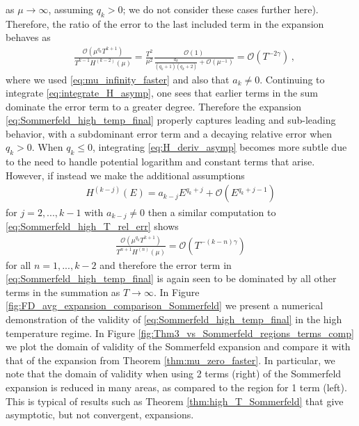 \documentclass[sn-mathphys,Numbered]{sn-jnl}
\begin{document}
as $\mu\to\infty$, assuming $q_k>0$; we do not consider these cases further here). Therefore, the ratio of the error to the last included term in the expansion behaves as
\begin{align}\label{eq:Sommerfeld_high_T_rel_err}
&\frac{\mathcal{O}(\mu^{q_k}T^{k+1})}{ T^{k-1} H^{(k-2)}(\mu)}=\frac{T^2}{\mu^2}\frac{\mathcal{O}(1)}{ \frac{a_k}{(q_k+1)(q_k+2)}+\mathcal{O}(\mu^{-1})}= \mathcal{O}(T^{-2\gamma})\,,
\end{align}
where we used \eqref{eq:mu_infinity_faster} and also that $a_k\neq 0$. Continuing to integrate \eqref{eq:integrate_H_asymp}, one sees that earlier terms in the sum dominate the error term to a  greater degree.  Therefore the expansion \eqref{eq:Sommerfeld_high_temp_final} properly  captures leading and sub-leading behavior, with a subdominant error term and a decaying relative error when $q_k>0$. When $q_k\leq 0$, integrating \eqref{eq:H_deriv_asymp} becomes more subtle due to the need to handle potential logarithm and constant terms that arise.  However, if instead we make the additional assumptions 
\begin{align}
H^{(k-j)}(E)=a_{k-j} E^{q_k+j} +\mathcal{O}(E^{q_k+j-1})
\end{align}
for $j=2,...,k-1$ with $a_{k-j}\neq 0$ then a similar computation to \eqref{eq:Sommerfeld_high_T_rel_err} shows
\begin{align}
    \frac{\mathcal{O}(\mu^{q_k}T^{k+1})}{T^{n+1}H^{(n)}(\mu)}= \mathcal{O}(T^{-(k-n)\gamma})
\end{align}
for all $n=1,...,k-2$ and therefore the error term in \eqref{eq:Sommerfeld_high_temp_final} is again seen to be dominated by all other terms in the summation as $T\to\infty$. In Figure \ref{fig:FD_avg_expansion_comparison_Sommerfeld} we present a  numerical demonstration of the validity of \eqref{eq:Sommerfeld_high_temp_final} in the high temperature regime. In   Figure \ref{fig:Thm3_vs_Sommerfeld_regions_terms_comp} we plot the domain of validity of the  Sommerfeld expansion  and compare it with that of the expansion from Theorem \ref{thm:mu_zero_faster}.  In particular, we note that the domain of validity when using 2 terms (right) of the Sommerfeld expansion is reduced in many areas, as compared to the region for 1 term (left). This is typical of results such as Theorem \ref{thm:high_T_Sommerfeld} that give asymptotic, but not convergent, expansions.
\end{document}
